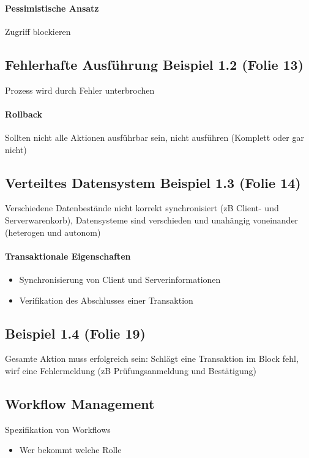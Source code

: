 \documentclass[ngerman]{scrartcl}
\begin{document}
\paragraph*{Pessimistische Ansatz}
Zugriff blockieren

\subsection*{Fehlerhafte Ausführung Beispiel 1.2 (Folie 13)}
Prozess wird durch Fehler unterbrochen

\paragraph*{Rollback}
Sollten nicht alle Aktionen ausführbar sein, nicht ausführen (Komplett oder gar nicht)

\subsection*{Verteiltes Datensystem Beispiel 1.3 (Folie 14)}
Verschiedene Datenbestände nicht korrekt synchronisiert (zB Client- und Serverwarenkorb), Datensysteme sind verschieden und unahängig voneinander (heterogen und autonom)

\paragraph*{Transaktionale Eigenschaften}
\begin{itemize}
  \item Synchronisierung von Client und Serverinformationen
  \item Verifikation des Abschlusses einer Transaktion
\end{itemize}

\subsection*{Beispiel 1.4 (Folie 19)}
Gesamte Aktion muss erfolgreich sein: Schlägt eine Transaktion im Block fehl, wirf eine Fehlermeldung (zB Prüfungsanmeldung und Bestätigung)

\subsection*{Workflow Management}
Spezifikation von Workflows 
\begin{itemize}
  \item Wer bekommt welche Rolle
\end{itemize}
\end{document}
